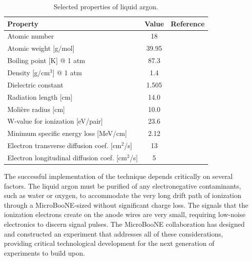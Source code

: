 \begin{table}[!htb]
   \centering
    \caption{Selected properties of liquid argon.} 
      \begin{tabular}{lcr} %
      \hline
      Property & Value & Reference\\
    \hline
   Atomic number & 18 &\\
   Atomic weight [g/mol] & 39.95 &\\
   Boiling point [K] @ 1 atm & 87.3 & \cite{ArProperties}\\
   Density [g/cm$^3$] @ 1 atm & 1.4 & \cite{ArProperties} \\
   Dielectric constant & 1.505 & \cite{DielectricPaper} \\
   Radiation length [cm] & 14.0 & \cite{Amsler20081} \\
   Moli\`{e}re radius [cm] & 10.0 &\cite{Amsler20081} \\
   W-value for ionization [eV/pair] & 23.6 & \cite{1975NucIM.131..249S,PhysRevA.9.1438} \\
   Minimum specific energy loss [MeV/cm] & 2.12 & \cite{Amsler20081} \\
   Electron transverse diffusion coef. [cm$^2$/s] & 13 & \cite{PhysRevA.20.2547,Derenzo,Cennini:1994-3ton} \\
   Electron longitudinal diffusion coef. [cm$^2$/s] & 5 & \cite{Cennini:1994-3ton, Atrazhev}\\
   \hline
   \end{tabular}

   \label{tab:nobleparam}
\end{table} 



The successful implementation of the \lartpc technique depends critically on several factors.   The liquid argon must be purified of any electronegative contaminants, such as water or oxygen, to accommodate the very long drift path of ionization through a MicroBooNE-sized \lartpc without significant charge loss.  The signals that the ionization electrons create on the anode wires are very small, requiring low-noise electronics to discern signal pulses.  The MicroBooNE collaboration has designed and constructed an experiment that addresses all of these considerations, providing critical technological development for the next generation of \lartpc experiments to build upon. 

